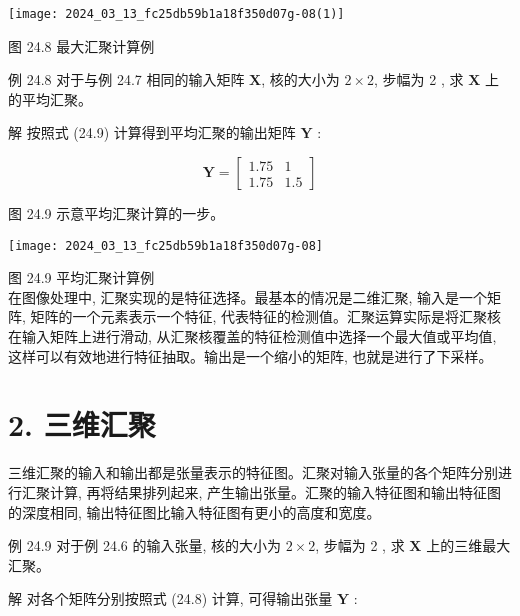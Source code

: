 \documentclass[10pt]{article}
\begin{document}
\begin{center}
\texttt{[image: 2024\_03\_13\_fc25db59b1a18f350d07g-08(1)]}
\end{center}

图 24.8 最大汇聚计算例

例 24.8 对于与例 24.7 相同的输入矩阵 $\boldsymbol{X}$, 核的大小为 $2 \times 2$, 步幅为 2 , 求 $\boldsymbol{X}$ 上的平均汇聚。

解 按照式 (24.9) 计算得到平均汇聚的输出矩阵 $\boldsymbol{Y}$ :

$$
\boldsymbol{Y}=\left[\begin{array}{ll}
1.75 & 1 \\
1.75 & 1.5
\end{array}\right]
$$

图 24.9 示意平均汇聚计算的一步。

\begin{center}
\texttt{[image: 2024\_03\_13\_fc25db59b1a18f350d07g-08]}
\end{center}

图 24.9 平均汇聚计算例\\
在图像处理中, 汇聚实现的是特征选择。最基本的情况是二维汇聚, 输入是一个矩阵, 矩阵的一个元素表示一个特征, 代表特征的检测值。汇聚运算实际是将汇聚核在输入矩阵上进行滑动, 从汇聚核覆盖的特征检测值中选择一个最大值或平均值, 这样可以有效地进行特征抽取。输出是一个缩小的矩阵, 也就是进行了下采样。

\section*{2. 三维汇聚}
三维汇聚的输入和输出都是张量表示的特征图。汇聚对输入张量的各个矩阵分别进行汇聚计算, 再将结果排列起来, 产生输出张量。汇聚的输入特征图和输出特征图的深度相同, 输出特征图比输入特征图有更小的高度和宽度。

例 24.9 对于例 24.6 的输入张量, 核的大小为 $2 \times 2$, 步幅为 2 , 求 $\boldsymbol{X}$ 上的三维最大汇聚。

解 对各个矩阵分别按照式 (24.8) 计算, 可得输出张量 $\boldsymbol{Y}$ :
\end{document}
